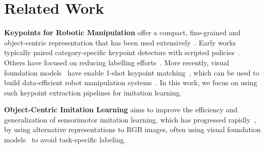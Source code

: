 \documentclass[letterpaper, 10 pt, conference]{ieeeconf}  %
\begin{document}
\section{Related Work}
\label{sec:related-work}

\textbf{Keypoints for Robotic Manipulation} offer a compact, fine-grained and object-centric representation that has been used extensively~\cite{manuelli2019kpam,adriaens2025spill,vecerik2021s3k,chen2021unsupervised}.
Early works typically paired category-specific keypoint detectors with scripted policies~\cite{adriaens2025spill,manuelli2019kpam}. Others have focused on reducing labelling efforts~\cite{vecerik2021s3k,chen2021unsupervised}. More recently, visual foundation models~\cite{bommasani2021foundation-models} have enable 1-shot keypoint matching~\cite{amir2021ViTFeatures,tang2023dift,simeoni2025dinov3}, which can be used to build data-efficient robot manipulation systems~\cite{huang2025rekep,di2024KAT,wang2025skil}. %
In this work, we focus on using such keypoint extraction pipelines for imitation learning.





\textbf{Object-Centric Imitation Learning} aims to improve the efficiency and generalization of sensorimotor imitation learning, which has progressed rapidly~\cite{barreiros2025LBM-1,chi2025diffusion_policy}, by using alternative representations to RGB images, often using visual foundation models~\cite{bommasani2021foundation-models} to avoid task-specific labeling. 
\end{document}
